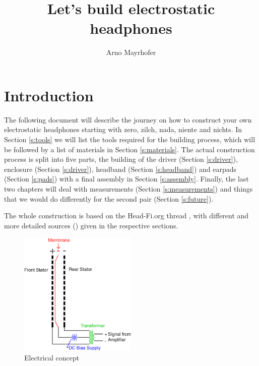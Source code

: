 \documentclass{article}
\begin{document}
\title{Let's build electrostatic headphones}
\author{Arno Mayrhofer}
\maketitle

\tableofcontents

\newpage

\section{Introduction}
\label{s:intro}
The following document will describe the journey on how to construct your own electrostatic headphones starting with zero, zilch, nada, niente and nichts. In Section \ref{s:tools} we will list the tools required for the building process, which will be followed by a list of materials in Section \ref{s:materials}. The actual construction process is split into five parts, the building of the driver (Section \ref{s:driver}), enclosure (Section \ref{s:driver}), headband (Section \ref{s:headband}) and earpads (Section \ref{s:pads}) with a final assembly in Section \ref{s:assembly}. Finally, the last two chapters will deal with measurements (Section \ref{s:measurements}) and things that we would do differently for the second pair (Section \ref{s:future}).

The whole construction is based on the Head-Fi.org thread \cite{head-fi-diy-thread}, with different and more detailed sources (\cite{electrostatic-hp-design,tcengineering-electrostatic-drivers,ww_1979}) given in the respective sections.

\begin{figure}[htb]
    \centering
    \includegraphics[width=0.5\textwidth]{images/esl_animation.png}
    \caption{Electrical concept}
    \label{f:intro:e-concept}
\end{figure}
\end{document}
